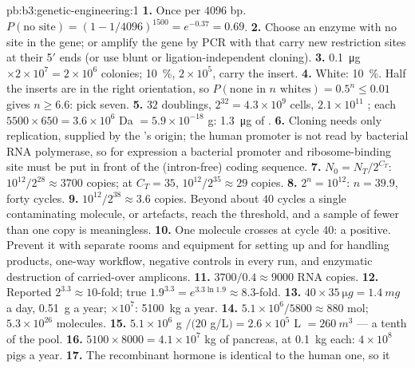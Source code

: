 \begin{solution}{pb:b3:genetic-engineering:1}
\textbf{1.} Once per $4096$ bp. $P(\text{no site}) = (1 - 1/4096)^{1500}
= e^{-0.37} = 0.69$.
\textbf{2.} Choose an enzyme with no site in the gene; or amplify the
gene by PCR with  that carry new restriction sites at their 5$'$
ends (or use blunt or ligation-independent cloning).
\textbf{3.} \qty{0.1}{\micro g}\,$\times 2\times 10^{7} = 2\times
10^{6}$ colonies; \qty{10}{\%}, $2\times 10^{5}$, carry the insert.
\textbf{4.} White: \qty{10}{\%}. Half the inserts are in the right
orientation, so $P(\text{none in } n \text{ whites}) = 0.5^{n} \le 0.01$
gives $n \ge 6.6$: pick seven.
\textbf{5.} $32$ doublings, $2^{32} = 4.3\times 10^{9}$ cells, $2.1\times
10^{11}$ ; each $5500\times 650 = 3.6\times 10^{6}$ Da $=
5.9\times 10^{-18}$ g: \qty{1.3}{\micro g} of .
\textbf{6.} Cloning needs only replication, supplied by the 's
origin; the human promoter is not read by bacterial RNA polymerase, so
for expression a bacterial promoter and ribosome-binding site must be
put in front of the (intron-free) coding sequence.
\textbf{7.} $N_{0} = N_{T}/2^{C_{T}}$: $10^{12}/2^{28} \approx 3700$
copies; at $C_{T} = 35$, $10^{12}/2^{35} \approx 29$ copies.
\textbf{8.} $2^{n} = 10^{12}$: $n = 39.9$, forty cycles.
\textbf{9.} $10^{12}/2^{38} \approx 3.6$ copies. Beyond about $40$
cycles a single contaminating molecule, or  artefacts, reach the
threshold, and a sample of fewer than one copy is meaningless.
\textbf{10.} One molecule crosses at cycle $40$: a positive. Prevent it
with separate rooms and equipment for setting up and for handling
products, one-way workflow, negative controls in every run, and
enzymatic destruction of carried-over amplicons.
\textbf{11.} $3700/0.4 \approx 9000$ RNA copies.
\textbf{12.} Reported $2^{3.3} \approx 10$-fold; true $1.9^{3.3} =
e^{3.3\ln 1.9} \approx 8.3$-fold.
\textbf{13.} $40\times \qty{35}{\micro g} = \qty{1.4}{mg}$ a day,
\qty{0.51}{g} a year; $\times 10^{7}$: \qty{5100}{kg} a year.
\textbf{14.} $5.1\times 10^{6}/5800 \approx 880$ mol; $5.3\times 10^{26}$
molecules.
\textbf{15.} $5.1\times 10^{6}$ g $/ (20$ g/L$) = 2.6\times 10^{5}$ L
$= \qty{260}{m^3}$ --- a tenth of the pool.
\textbf{16.} $5100\times 8000 = 4.1\times 10^{7}$ kg of pancreas, at
\qty{0.1}{kg} each: $4\times 10^{8}$ pigs a year.
\textbf{17.} The recombinant hormone is identical to the human one, so it

\end{solution}
